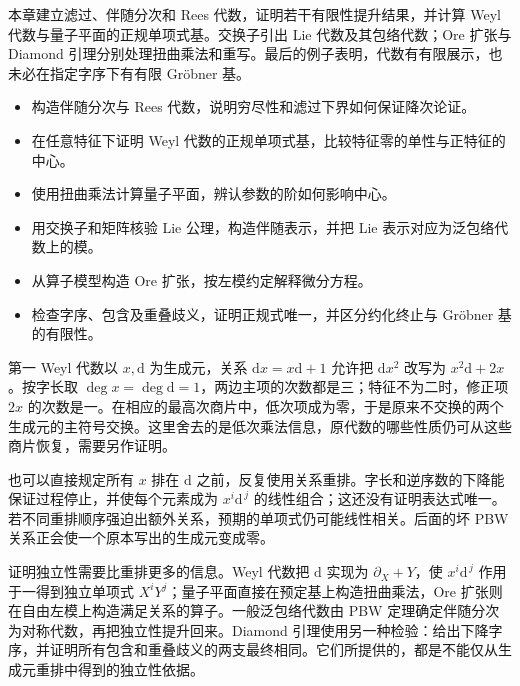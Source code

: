 

\begin{chapterabstract}
	本章建立滤过、伴随分次和 Rees 代数，证明若干有限性提升结果，并计算 Weyl 代数与量子平面的正规单项式基。交换子引出 Lie 代数及其包络代数；Ore 扩张与 Diamond 引理分别处理扭曲乘法和重写。最后的例子表明，代数有有限展示，也未必在指定字序下有有限 Gröbner 基。
\end{chapterabstract}

\begin{learninggoals}
	\begin{itemize}
		\item 构造伴随分次与 Rees 代数，说明穷尽性和滤过下界如何保证降次论证。
		\item 在任意特征下证明 Weyl 代数的正规单项式基，比较特征零的单性与正特征的中心。
		\item 使用扭曲乘法计算量子平面，辨认参数的阶如何影响中心。
		\item 用交换子和矩阵核验 Lie 公理，构造伴随表示，并把 Lie 表示对应为泛包络代数上的模。
		\item 从算子模型构造 Ore 扩张，按左模约定解释微分方程。
		\item 检查字序、包含及重叠歧义，证明正规式唯一，并区分约化终止与 Gröbner 基的有限性。
	\end{itemize}
\end{learninggoals}

第一 Weyl 代数以 \(x,\mathrm{d}\) 为生成元，关系 \(\mathrm{d}x=x\mathrm{d}+1\) 允许把 \(\mathrm{d}x^2\) 改写为 \(x^2\mathrm{d}+2x\)。按字长取 \(\deg x=\deg\mathrm{d}=1\)，两边主项的次数都是三；特征不为二时，修正项 \(2x\) 的次数是一。在相应的最高次商片中，低次项成为零，于是原来不交换的两个生成元的主符号交换。这里舍去的是低次乘法信息，原代数的哪些性质仍可从这些商片恢复，需要另作证明。

\ProseParagraphBreak

也可以直接规定所有 \(x\) 排在 \(\mathrm{d}\) 之前，反复使用关系重排。字长和逆序数的下降能保证过程停止，并使每个元素成为 \(x^i\mathrm{d}^{\,j}\) 的线性组合；这还没有证明表达式唯一。若不同重排顺序强迫出额外关系，预期的单项式仍可能线性相关。后面的坏 PBW 关系正会使一个原本写出的生成元变成零。

\ProseParagraphBreak

证明独立性需要比重排更多的信息。Weyl 代数把 \(\mathrm{d}\) 实现为 \(\partial_X+Y\)，使 \(x^i\mathrm{d}^{\,j}\) 作用于一得到独立单项式 \(X^iY^j\)；量子平面直接在预定基上构造扭曲乘法，Ore 扩张则在自由左模上构造满足关系的算子。一般泛包络代数由 PBW 定理确定伴随分次为对称代数，再把独立性提升回来。Diamond 引理使用另一种检验：给出下降字序，并证明所有包含和重叠歧义的两支最终相同。它们所提供的，都是不能仅从生成元重排中得到的独立性依据。

